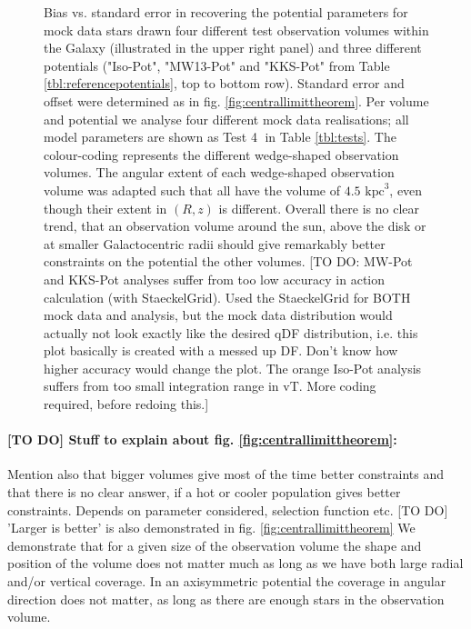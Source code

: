 \begin{figure}
\caption{Bias vs. standard error in recovering the potential parameters for mock data stars drawn four different test observation volumes within the Galaxy (illustrated in the upper right panel) and three different potentials ("Iso-Pot", "MW13-Pot" and "KKS-Pot" from Table \ref{tbl:referencepotentials}, top to bottom row). Standard error and offset were determined as in fig. \ref{fig:centrallimittheorem}. Per volume and potential we analyse four different mock data realisations; all model parameters are shown as Test \textcircled{4} in Table \ref{tbl:tests}. The colour-coding represents the different wedge-shaped observation volumes. The angular extent of each wedge-shaped observation volume was adapted such that all have the volume of $4.5 \text{ kpc}^3$, even though their extent in $(R,z)$ is different.  Overall there is no clear trend, that an observation volume around the sun, above the disk or at smaller Galactocentric radii should give remarkably better constraints on the potential the other volumes. [TO DO: MW-Pot and KKS-Pot analyses suffer from too low accuracy in action calculation (with StaeckelGrid). Used the StaeckelGrid for BOTH mock data and analysis, but the mock data distribution would actually not look exactly like the desired qDF distribution, i.e. this plot basically is created with a messed up DF. Don't know how higher accuracy would change the plot. The orange Iso-Pot analysis suffers from too small integration range in vT. More coding required, before redoing this.]}
\label{fig:wedFlexVol_bias_vs_SE}
\end{figure}

 \paragraph{[TO DO] Stuff to explain about fig. \ref{fig:centrallimittheorem}:} Mention also that bigger volumes give most of the time better constraints and that there is no clear answer, if a hot or cooler population gives better constraints. Depends on parameter considered, selection function etc.
[TO DO] 'Larger is better' is also demonstrated in fig. \ref{fig:centrallimittheorem}
We demonstrate that for a given size of the observation volume the shape and position of the volume does not matter much as long as we have both large radial and/or vertical coverage. 
In an axisymmetric potential the coverage in angular direction does not matter, as long as there are enough stars in the observation volume.


